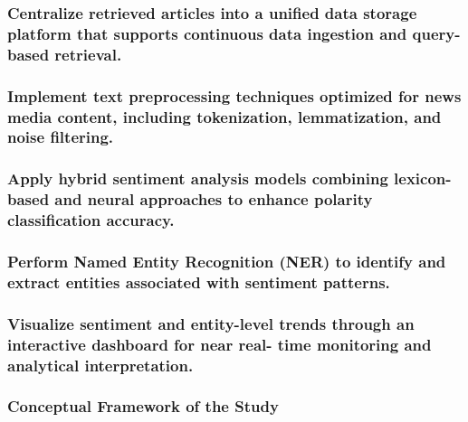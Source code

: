 \subsubsection{Centralize retrieved articles into a unified data storage platform that supports continuous data ingestion and query-based retrieval.}\label{centralize-retrieved-articles-into-a-unified-data-storage-platform-that-supports-continuous-data-ingestion-and-query-based-retrieval.}

\subsubsection{Implement text preprocessing techniques optimized for news media content, including tokenization, lemmatization, and noise filtering.}\label{implement-text-preprocessing-techniques-optimized-for-news-media-content-including-tokenization-lemmatization-and-noise-filtering.}

\subsubsection{Apply hybrid sentiment analysis models combining lexicon-based and neural approaches to enhance polarity classification accuracy.}\label{apply-hybrid-sentiment-analysis-models-combining-lexicon-based-and-neural-approaches-to-enhance-polarity-classification-accuracy.}

\subsubsection{Perform Named Entity Recognition (NER) to identify and extract entities associated with sentiment patterns.}\label{perform-named-entity-recognition-ner-to-identify-and-extract-entities-associated-with-sentiment-patterns.}

\subsubsection{Visualize sentiment and entity-level trends through an interactive dashboard for near real- time monitoring and analytical interpretation.}\label{visualize-sentiment-and-entity-level-trends-through-an-interactive-dashboard-for-near-real--time-monitoring-and-analytical-interpretation.}

\subsubsection{\texorpdfstring{\textbf{Conceptual Framework of the Study}}{Conceptual Framework of the Study}}\label{conceptual-framework-of-the-study}

